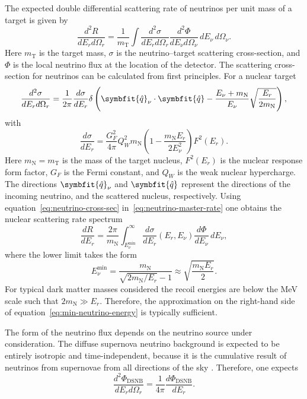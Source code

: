 \documentclass[b5paper, 10pt, twoside]{book}
\newcommand{\der}[2]{\frac{d#1}{d#2}}
\newcommand{\ddder}[3]{\frac{d^2#1}{d#2d#3}}
\newcommand{\unitv}[1]{\symbfit{\hat{#1}}}
\newcommand{\difd}{\,d}
\begin{document}
The expected double differential scattering rate of neutrinos per unit mass of a target is given by
\begin{equation}
\ddder{R}{E_r}{\Omega_r}=\frac{1}{m_\text{T}}\int\ddder{\sigma}{E_r}{\Omega_r}\ddder{\Phi}{E_\nu}{\Omega_\nu}\difd E_\nu\difd\Omega_\nu.
\label{eq:neutrino-master-rate}
\end{equation}
Here $m_\text{T}$ is the target mass, $\sigma$ is the neutrino--target scattering cross-section, and $\Phi$ is the local neutrino flux at the location of the detector. The scattering cross-section for neutrinos can be calculated from first principles. For a nuclear target
\begin{equation}
\ddder{\sigma}{E_r}{\Omega_r}=\frac{1}{2\pi}\der{\sigma}{E_r}\delta\left(\unitv{q}_\nu\cdot\unitv{q}-\frac{E_\nu+m_\text{N}}{E_\nu}\sqrt{\frac{E_r}{2m_\text{N}}}\right),
\label{eq:neutrino-cross-sec}
\end{equation}
with
\begin{equation}
\der{\sigma}{E_r}=\frac{G_F^2}{4\pi}Q_W^2m_\text{N}\left(1-\frac{m_\text{N}E_r}{2E_\nu^2}\right)F^2(E_r).
\end{equation}
Here $m_\text{N}=m_\text{T}$ is the mass of the target nucleus, $F^2(E_r)$ is the nuclear response form factor, $G_F$ is the Fermi constant, and $Q_W$ is the weak nuclear hypercharge. The directions $\unitv{q}_\nu$ and $\unitv{q}$ represent the directions of the incoming neutrino, and the scattered nucleus, respectively. Using equation~\eqref{eq:neutrino-cross-sec} in~\eqref{eq:neutrino-master-rate} one obtains the nuclear scattering rate spectrum
\begin{equation}
\der{R}{E_r}=\frac{2\pi}{m_\text{N}}\int_{E_\nu^\text{min}}^\infty\der{\sigma}{E_r}(E_r,E_\nu)\der{\Phi}{E_\nu}\difd E_\nu,
\end{equation}
where the lower limit takes the form
\begin{equation}
E_\nu^\text{min}=\frac{m_\text{N}}{\sqrt{2m_\text{N}/E_r}-1}\approx\sqrt{\frac{m_\text{N}E_r}{2}}.
\label{eq:min-neutrino-energy}
\end{equation}
For typical dark matter masses considered the recoil energies are below the MeV scale such that $2m_\text{N}\gg E_r$. Therefore, the approximation on the right-hand side of equation~\eqref{eq:min-neutrino-energy} is typically sufficient.

The form of the neutrino flux depends on the neutrino source under consideration. The diffuse supernova neutrino background is expected to be entirely isotropic and time-independent, because it is the cumulative result of neutrinos from supernovae from all directions of the sky \parencite{Beacom2010}. Therefore, one expects
\begin{equation}
\ddder{\Phi_\text{DSNB}}{E_r}{\Omega_r}=\frac{1}{4\pi}\der{\Phi_\text{DSNB}}{E_r}.
\end{equation}
\end{document}
